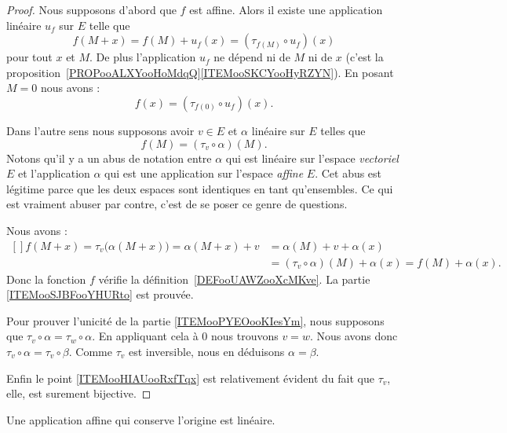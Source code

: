 \begin{proof}
	Nous supposons d'abord que \( f\) est affine. Alors il existe une application linéaire \( u_f\) sur \( E\) telle que
	\begin{equation}
		f(M+x)=f(M)+u_f(x)=(\tau_{f(M)}\circ u_f)(x)
	\end{equation}
	pour tout \( x\) et \( M\). De plus l'application \( u_f\) ne dépend ni de \( M\) ni de \( x\) (c'est la proposition~\ref{PROPooALXYooHoMdqQ}\ref{ITEMooSKCYooHyRZYN}). En posant \( M=0\) nous avons :
	\begin{equation}
		f(x)=(\tau_{f(0)}\circ u_f)(x).
	\end{equation}

	Dans l'autre sens nous supposons avoir \( v\in E\) et \( \alpha\) linéaire sur \( E\) telles que
	\begin{equation}
		f(M)=(\tau_v\circ\alpha)(M).
	\end{equation}
	Notons qu'il y a un abus de notation entre \( \alpha\) qui est linéaire sur l'espace \emph{vectoriel} \( E\) et l'application \( \alpha\) qui est une application sur l'espace \emph{affine} \( E\). Cet abus est légitime parce que les deux espaces sont identiques en tant qu'ensembles. Ce qui est vraiment abuser par contre, c'est de se poser ce genre de questions.

	Nous avons :
	\begin{equation}
		\begin{aligned}[]
			f(M+x)=\tau_v\big( \alpha(M+x) \big)=\alpha(M+x)+v & =\alpha(M)+v+\alpha(x)
			\\&=(\tau_v\circ\alpha)(M)+\alpha(x)=f(M)+\alpha(x).
		\end{aligned}
	\end{equation}
	Donc la fonction \( f\) vérifie la définition~\ref{DEFooUAWZooXcMKve}. La partie \ref{ITEMooSJBFooYHURto} est prouvée.

	Pour prouver l'unicité de la partie \ref{ITEMooPYEOooKIesYm}, nous supposons que \( \tau_v\circ\alpha=\tau_w\circ \alpha\). En appliquant cela à \( 0\) nous trouvons \( v=w\). Nous avons donc \( \tau_v\circ \alpha=\tau_v\circ\beta\). Comme \( \tau_v\) est inversible, nous en déduisons \( \alpha=\beta\).

	Enfin le point \ref{ITEMooHIAUooRxfTqx} est relativement évident du fait que \( \tau_v\), elle, est surement bijective.
\end{proof}

\begin{corollary}       \label{CORooATCNooUwEPNI}
	Une application affine qui conserve l'origine est linéaire.
\end{corollary}

